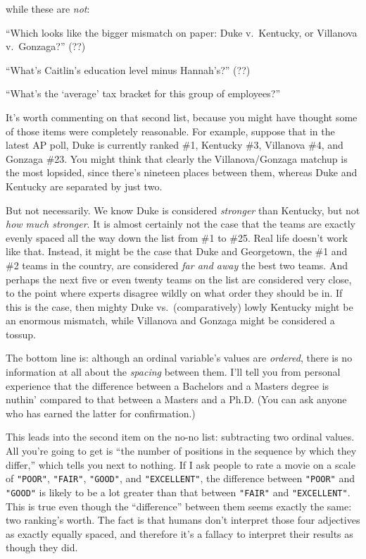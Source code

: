 \pagebreak
while these are \textit{not}:

\begin{compactitem}
\item[\leftthumbsdown] ``Which looks like the bigger mismatch on paper: Duke
v.~Kentucky, or Villanova v.~Gonzaga?'' (??)
\item[\leftthumbsdown] ``What's Caitlin's education level minus Hannah's?'' (??)
\item[\leftthumbsdown] ``What's the `average' tax bracket for this group of
employees?''
\end{compactitem}

It's worth commenting on that second list, because you might have thought some
of those items were completely reasonable. For example, suppose that in the
latest AP poll, Duke is currently ranked \#1, Kentucky \#3, Villanova \#4, and
Gonzaga \#23. You might think that clearly the Villanova/Gonzaga matchup is the
most lopsided, since there's nineteen places between them, whereas Duke and
Kentucky are separated by just two.

But not necessarily. We know Duke is considered \textit{stronger} than
Kentucky, but not \textit{how much stronger}. It is almost certainly not the
case that the teams are exactly evenly spaced all the way down the list from
\#1 to \#25. Real life doesn't work like that. Instead, it might be the case
that Duke and Georgetown, the \#1 and \#2 teams in the country, are considered
\textit{far and away} the best two teams. And perhaps the next five or even
twenty teams on the list are considered very close, to the point where experts
disagree wildly on what order they should be in. If this is the case, then
mighty Duke vs.~(comparatively) lowly Kentucky might be an enormous mismatch,
while Villanova and Gonzaga might be considered a tossup.

The bottom line is: although an ordinal variable's values are \textit{ordered},
there is no information at all about the \textit{spacing} between them. I'll
tell you from personal experience that the difference between a Bachelors and a
Masters degree is nuthin' compared to that between a Masters and a Ph.D. (You
can ask anyone who has earned the latter for confirmation.)

This leads into the second item on the no-no list: subtracting two ordinal
values. All you're going to get is ``the number of positions in the sequence by
which they differ,'' which tells you next to nothing. If I ask people to rate a
movie on a scale of \texttt{"POOR"}, \texttt{"FAIR"}, \texttt{"GOOD"}, and
\texttt{"EXCELLENT"}, the difference between \texttt{"POOR"} and
\texttt{"GOOD"} is likely to be a lot greater than that between \texttt{"FAIR"}
and \texttt{"EXCELLENT"}. This is true even though the ``difference'' between
them seems exactly the same: two ranking's worth. The fact is that humans
don't interpret those four adjectives as exactly equally spaced, and therefore
it's a fallacy to interpret their results as though they did.


